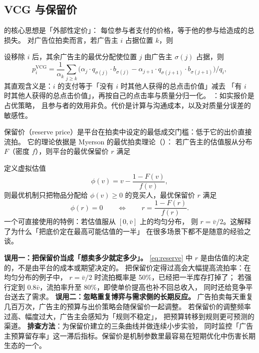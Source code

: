 \subsection{VCG 与保留价}

 的核心思想是「外部性定价」：
每位参与者支付的价格，等于他的参与给造成的总损失。
对广告位拍卖而言，若广告主 $i$ 占据位置 $k$，则

\begin{formulacard}[VCG 支付]
设移除 $i$ 后，其余广告主的最优分配使位置 $j$ 由广告主 $\sigma(j)$ 占据，则
\begin{equation}
p_i^{\text{VCG}} = \frac{1}{\alpha_k}
\sum_{j \ge k} \Big( \alpha_j \cdot q_{\sigma(j)} \cdot b_{\sigma(j)}
- \alpha_{j+1} \cdot q_{\sigma(j+1)} \cdot b_{\sigma(j+1)} \Big) \Big/ q_i ,
\label{eq:vcg-payment}
\end{equation}
其直观含义是：$i$ 的支付等于「没有 $i$ 时其他人获得的总点击价值」减去
「有 $i$ 时其他人获得的总点击价值」，再按自己的点击率与质量分归一化。
：如实报价是占优策略，
且参与者的效用非负。代价是计算与沟通成本，以及对质量分误差的敏感性。
\end{formulacard}

保留价（reserve price）是平台在拍卖中设定的最低成交门槛：低于它的出价直接流拍。
它的理论依据是 Myerson 的最优拍卖理论（\cite{myerson1981optimal}）：
若广告主的估值服从分布 $F$（密度 $f$），则平台的最优保留价 $r$ 满足

\begin{formulacard}
定义虚拟估值
\begin{equation}
\phi(v) = v - \frac{1 - F(v)}{f(v)} ,
\label{eq:virtual-value}
\end{equation}
则最优机制只把物品分配给 $\phi(v) \ge 0$ 的竞买人，最优保留价 $r$ 满足
\begin{equation}
\phi(r) = 0
\qquad \Longleftrightarrow \qquad
r = \frac{1 - F(r)}{f(r)} .
\label{eq:reserve}
\end{equation}
一个可直接使用的特例：若估值服从 $[0, \bar{v}]$ 上的均匀分布，
则 $r = \bar{v}/2$。这解释了为什么「把底价定在最高可能估值的一半」
在很多场景下都不是随意的经验之谈。
\end{formulacard}

\begin{pitfall}[保留价的两类常见误用]
\textbf{误用一：把保留价当成「想卖多少就定多少」。}
\cref{eq:reserve} 中 $r$ 是由估值的决定的，不是由平台的成本或期望决定的。
把保留价定得过高会大幅提高流拍率：在均匀分布的例子中，
$r = \bar{v}/2$ 时流拍概率是 50\%，已经把一半库存打掉了；
若强行定到 $0.8\bar{v}$，流拍率升至 80\%，即使单价提高也补不回总收入，
同时还给竞争平台送去了需求。
\textbf{误用二：忽略重复博弈与需求侧的长期反应。}
广告拍卖每天重复几百万次，广告主的预算与出价策略会随保留价一起调整。
若保留价的调整频率过高、幅度过大，广告主会感知为「规则不稳定」，
把预算转移到规则更可预测的渠道。
\textbf{排查方法}：为保留价建立的三条曲线并做连续小步实验，
同时监控「广告主预算留存率」这一滞后指标。保留价是机制参数里最容易在短期优化中伤害长期生态的一个。
\end{pitfall}

